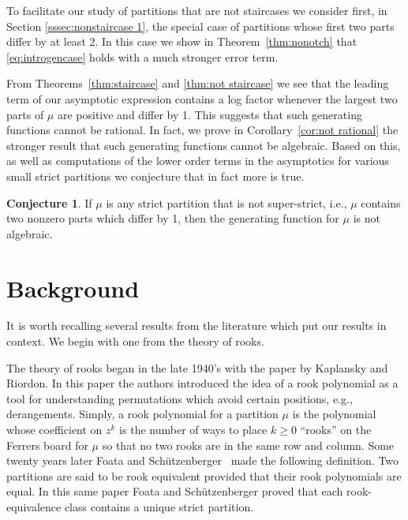 \documentclass{article}
\theoremstyle{plain}
\theoremstyle{definition}
\newtheorem{conjecture}[theorem]{Conjecture}
\begin{document}
To facilitate our study of partitions that are not staircases we consider first, in Section \ref{sssec:nonstaircase 1}, the special case of partitions whose first two parts differ by at least 2.  In this case we show in Theorem~\ref{thm:nonotch} that \eqref{eq:introgencase} holds with a much stronger error term.

From Theorems~\ref{thm:staircase} and \ref{thm:not staircase} we see that the leading term of our asymptotic expression contains a log factor whenever the largest two parts of $\mu$ are positive and differ by 1.  This suggests that such generating functions cannot be rational.  In fact, we prove in  Corollary~\ref{cor:not rational} the stronger result that such generating functions cannot be algebraic.  Based on this, as well as computations of the lower order terms in the asymptotics for various small strict partitions we conjecture that in fact more is true.

\begin{conjecture}
If $\mu$ is any strict partition that is not super-strict, i.e., $\mu$ contains two nonzero parts which differ by 1, then the generating function for $\mu$ is not algebraic.
\end{conjecture}





\section{Background} \label{sec:background}
It is worth recalling several results from the literature which put our results in context.  We begin with one from the theory of rooks.  

The theory of rooks began in the late 1940's with the paper \cite{kaplansky1946problem} by Kaplansky and Riordon.  In this paper the authors introduced the idea of a rook polynomial as a tool for understanding permutations which avoid certain positions, e.g., derangements.  Simply, a rook polynomial for a partition $\mu$ is the polynomial whose coefficient on $z^k$ is the number of ways to place $k\geq 0$ ``rooks'' on the Ferrers board for $\mu$ so that no two rooks are in the same row and column.  Some twenty years later Foata and Sch\"{u}tzenberger~\cite{foata1970rook} made the following definition.  Two partitions are said to be rook equivalent provided that their rook polynomials are equal. In this same paper Foata and Sch\"{u}tzenberger proved that each rook-equivalence class contains a unique strict partition.  
\end{document}
